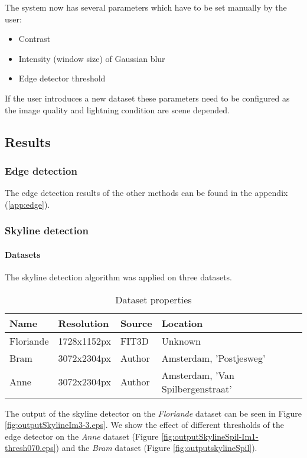 The system now has several parameters which have to be set manually by the user:
\begin{itemize}
	\item Contrast
	\item Intensity (window size) of Gaussian blur
	\item Edge detector threshold
\end{itemize}

If the user introduces a new dataset these parameters need to be configured
as the image quality and lightning condition are scene depended.


\subsection{Results}
\subsubsection{Edge detection}
\label{sec:ResultEdge}
The edge detection results of the other methods can be found in the appendix
(\ref{app:edge}).
\clearpage


\subsubsection{Skyline detection}
\paragraph{Datasets}
The skyline detection algorithm was applied on three datasets. 

\begin{table}[ht]
\caption{Dataset properties}
\begin{tabular}{|l||l|l|l|}
\hline
Name 	& Resolution 	& Source	& Location\\
\hline
\hline
Floriande & 1728x1152px  & FIT3D \cite{FIT3D}  	& Unknown\\
\hline
Bram	 & 3072x2304px  & Author					& Amsterdam, 'Postjesweg'\\
\hline
Anne	& 3072x2304px  & Author					& Amsterdam, 'Van Spilbergenstraat'\\
\hline
\end{tabular}
\end{table}

The output of the skyline detector on the \emph{Floriande}
dataset \cite{FIT3D} can be seen in Figure \ref{fig:outputSkylineIm3-3.eps}.
We show the effect of different thresholds of the edge detector on the
\emph{Anne} dataset (Figure \ref{fig:outputSkylineSpil-Im1-thresh070.eps})
and the 
\emph{Bram} dataset (Figure \ref{fig:outputskylineSpil}). 

